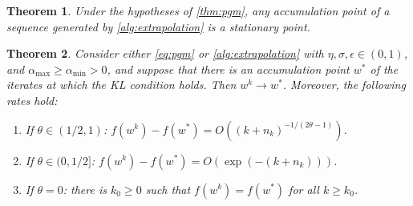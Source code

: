 \documentclass{article}
\newcommand{\alert}[1]{{#1}}
\theoremstyle{plain}
\newtheorem{theorem}{Theorem}[section]
\theoremstyle{definition}
\theoremstyle{remark}
\newcommand{\cp}[1]{\footnote{\textbf{CP:} #1}}
\newcommand\inner[2]{\left\langle #1, #2 \right\rangle}
\newcommand{\Tpg}{T_{\rm PG}^{\lambda}}
\newcommand{\norm}[1]{{\left\|{#1}\right\|}}
\begin{document}
\begin{theorem}
	\label{thm:global_acce}
	Under the hypotheses of \cref{thm:pgm}, any
	accumulation point of a sequence generated by \cref{alg:extrapolation}
	is a stationary point.
\end{theorem}
\begin{theorem}
\label{thm:rate2}
\alert{Consider either \cref{eq:pgm} or
\cref{alg:extrapolation} with }$\eta,
\sigma,{\epsilon}\in (0,1)$, and $\alpha_{\max} \geq \alpha_{\min} > 0$,
and suppose that there is an accumulation
point $w^*$ of the iterates at which
the KL condition holds. Then $w^k\to w^*$. Moreover, the following rates
hold:
\begin{enumerate}[leftmargin=*]
	\item[(a)] If \alert{$\theta \in (1/2,1)$}: $f(w^k) - f(w^*) =
	O((k + n_k)^{-1/\alert{(2\theta -1)}})$.
\item[(b)] If \alert{$\theta \in (0, 1/2]$}: $f(w^k) - f(w^*) = O(\exp(-(k
		+ n_k)))$.
	\item[\alert{(c)}] \alert{If \alert{$\theta = 0$}:
there 
is $k_0 \geq 0$ such that $f(w^k) = f(w^*)$ for all $k
	\geq k_0$}.
\end{enumerate}
\end{theorem}
\end{document}
